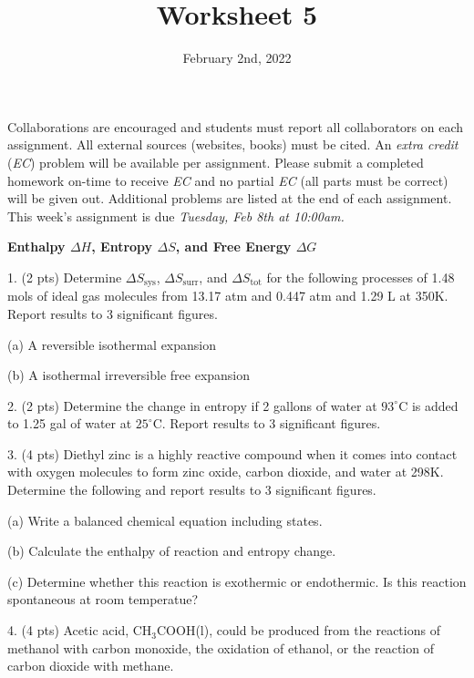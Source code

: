 \documentclass[11pt]{article}
\title{\textbf{Worksheet 5}}
\date{\vspace{-2em}February 2nd, 2022}
\begin{document}
\maketitle

Collaborations are encouraged and students must report all collaborators
on each assignment. All external sources (websites, books) must be
cited. An \textit{extra credit} (\textit{EC}) problem will be available per
assignment. Please submit a completed homework on-time to receive \textit{EC}
and no partial \textit{EC} (all parts must be correct) will be given out.
Additional problems are listed at the end of each assignment. This week's
assignment is due \textit{Tuesday, Feb 8th at 10:00am.}

\textbf{Enthalpy $\Delta H$, Entropy $\Delta S$, and Free Energy $\Delta G$}

1. (2 pts) Determine $\Delta S_\text{sys}$, $\Delta S_\text{surr}$, and $\Delta S_\text{tot}$ for the
following processes of 1.48 mols of ideal gas molecules from 13.17 atm and 0.447 atm
and 1.29 L at 350K. Report results to 3 significant figures.

(a) A reversible isothermal expansion

(b) A isothermal irreversible free expansion

\vspace{2.5in}

2. (2 pts) Determine the change in entropy if 2 gallons of water at $93^\circ\text{C}$ is added to
1.25 gal of water at $25^\circ\text{C}$. Report results to 3 significant figures.

\vspace{2.5in}

3. (4 pts) Diethyl zinc is a highly reactive compound when it comes into contact with oxygen molecules
to form zinc oxide, carbon dioxide, and water at 298K. Determine the following and report results
to 3 significant figures.

(a) Write a balanced chemical equation including states.

(b) Calculate the enthalpy of reaction and entropy change.

(c) Determine whether this reaction is exothermic or endothermic. Is this reaction spontaneous
at room temperatue?

\vspace{2.5in}

4. (4 pts) Acetic acid, CH$_3$COOH(l), could be produced from the reactions of methanol with carbon monoxide,
the oxidation of ethanol, or the reaction of carbon dioxide with methane.
\end{document}
